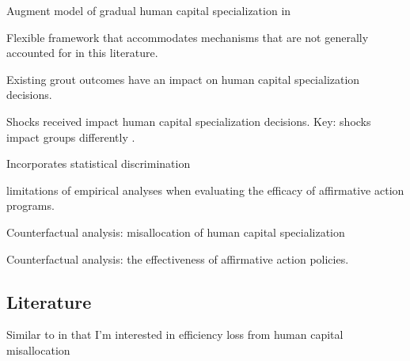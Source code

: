 \documentclass[10 pt]{article}
\begin{document}
{\begin{outline}
\begin{blist}
\item Augment model of gradual human capital specialization in \textcite{AF20}

\item Flexible framework that accommodates mechanisms that are not generally accounted for in this literature. \

\item Existing grout outcomes have an impact on human capital specialization decisions. 

\item Shocks received impact human capital specialization decisions. Key: shocks impact groups differently .

\item Incorporates statistical discrimination 

\item limitations of empirical analyses when evaluating the efficacy of affirmative action programs. 

\item Counterfactual analysis: misallocation of human capital specialization

\item Counterfactual analysis: the effectiveness of affirmative action policies. 

\end{blist}





\end{outline}

\subsection*{Literature}

\begin{blist}

\item Similar to \textcite{D08} in that I'm interested in efficiency loss from human capital misallocation 

\end{blist}


} %
\end{document}
